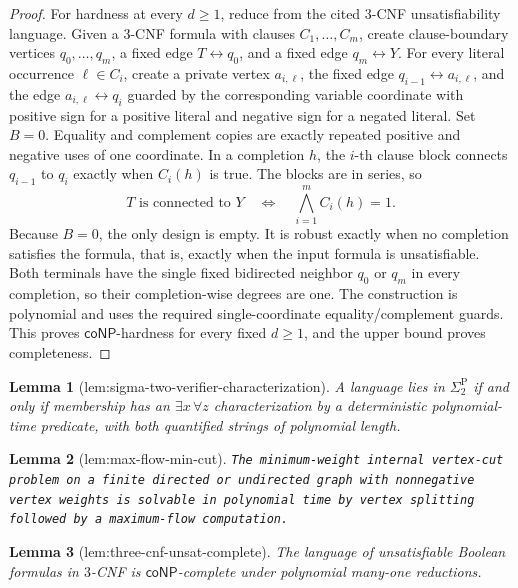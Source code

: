 \documentclass{article}
\newtheorem{lemma}{Lemma}
\begin{document}
\begin{proof}
For hardness at every \(d\ge1\), reduce from the cited \(3\)-CNF unsatisfiability language.  Given a \(3\)-CNF formula with clauses \(C_1,\ldots,C_m\), create clause-boundary vertices \(q_0,\ldots,q_m\), a fixed edge \(T\leftrightarrow q_0\), and a fixed edge \(q_m\leftrightarrow Y\).  For every literal occurrence \(\ell\in C_i\), create a private vertex \(a_{i,\ell}\), the fixed edge \(q_{i-1}\leftrightarrow a_{i,\ell}\), and the edge \(a_{i,\ell}\leftrightarrow q_i\) guarded by the corresponding variable coordinate with positive sign for a positive literal and negative sign for a negated literal.  Set \(B=0\).  Equality and complement copies are exactly repeated positive and negative uses of one coordinate.  In a completion \(h\), the \(i\)-th clause block connects \(q_{i-1}\) to \(q_i\) exactly when \(C_i(h)\) is true.  The blocks are in series, so
\[
 T\text{ is connected to }Y
 \quad\Longleftrightarrow\quad
 \bigwedge_{i=1}^m C_i(h)=1.
\]
Because \(B=0\), the only design is empty.  It is robust exactly when no completion satisfies the formula, that is, exactly when the input formula is unsatisfiable.  Both terminals have the single fixed bidirected neighbor \(q_0\) or \(q_m\) in every completion, so their completion-wise degrees are one.  The construction is polynomial and uses the required single-coordinate equality/complement guards.  This proves \(\mathsf{coNP}\)-hardness for every fixed \(d\ge1\), and the upper bound proves completeness.
\end{proof}

\begin{lemma}[lem:sigma-two-verifier-characterization]\label{lem:sigma-two-verifier-characterization}
A language lies in \(\Sigma _2^{\mathrm P}\) if and only if membership has an \(\exists x\,\forall z\) characterization by a deterministic polynomial-time predicate, with both quantified strings of polynomial length.
\end{lemma}

\begin{lemma}[lem:max-flow-min-cut]\label{lem:max-flow-min-cut}
\texttt{The minimum-\allowbreak{}weight internal vertex-\allowbreak{}cut problem on a finite directed or undirected graph with nonnegative vertex weights is solvable in polynomial time by vertex splitting followed by a maximum-\allowbreak{}flow computation.}
\end{lemma}

\begin{lemma}[lem:three-cnf-unsat-complete]\label{lem:three-cnf-unsat-complete}
The language of unsatisfiable Boolean formulas in \(3\)-CNF is \(\mathsf{coNP}\)-complete under polynomial many-one reductions.
\end{lemma}
\end{document}
